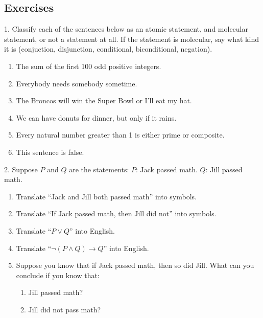 \documentclass[10pt,]{book}
\theoremstyle{plain}
\theoremstyle{definition}
\numberwithin{equation}{chapter}
\def\imp{\rightarrow}
\begin{document}
\subsection[Exercises]{Exercises}\label{exercises_intro-statements}
\begin{exerciselist}
\item[1.]\hypertarget{exercise-1}{}Classify each of the sentences below as an atomic statement, and molecular statement, or not a statement at all.  If the statement is molecular, say what kind it is (conjuction, disjunction, conditional, biconditional, negation).
        \leavevmode%
\begin{enumerate}[label=(\alph*)]
\item\hypertarget{li-1}{}The sum of the first 100 odd positive integers.%
\item\hypertarget{li-2}{}Everybody needs somebody sometime.%
\item\hypertarget{li-3}{}The Broncos will win the Super Bowl or I'll eat my hat.%
\item\hypertarget{li-4}{}We can have donuts for dinner, but only if it rains.%
\item\hypertarget{li-5}{}Every natural number greater than 1 is either prime or composite.%
\item\hypertarget{li-6}{}This sentence is false.%
\end{enumerate}

\par\smallskip
\item[2.]\hypertarget{exercise-2}{}
    Suppose \(P\) and \(Q\) are the statements:
    \(P\): Jack passed math.
    \(Q\): Jill passed math.
\leavevmode%
\begin{enumerate}[label=(\alph*)]
\item\hypertarget{li-13}{} Translate ``Jack and Jill both passed math'' into symbols. %
\item\hypertarget{li-14}{} Translate ``If Jack passed math, then Jill did not'' into symbols. %
\item\hypertarget{li-15}{} Translate ``\(P \vee Q\)'' into English. %
\item\hypertarget{li-16}{} Translate ``\(\neg(P \wedge Q) \imp Q\)'' into English. %
\item\hypertarget{li-17}{} Suppose you know that if Jack passed math, then so did Jill.  What can you conclude if you know that:
\begin{enumerate}[label=\roman*.]
\item\hypertarget{li-18}{} Jill passed math?  %
\item\hypertarget{li-19}{}  Jill did not pass math?%
\end{enumerate}


\end{enumerate}
\end{exerciselist}
\end{document}
